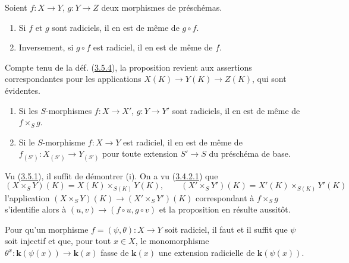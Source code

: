 \begin{proposition}[3.5.6]
\label{I.3.5.6-fr}
Soient $f:X\to Y$, $g:Y\to Z$ deux morphismes de préschémas.
\begin{enumerate}
  \item[(i)] Si $f$ et $g$ sont radiciels, il en est de même de $g\circ f$.
  \item[(ii)] Inversement, si $g\circ f$ est radiciel, il en est de même de
  $f$.
\end{enumerate}
\end{proposition}

Compte tenu de la déf. (\hyperref[I.3.5.4-fr]{3.5.4}), la proposition revient
aux assertions correspondantes pour les applications
$X(K)\to Y(K)\to Z(K)$, qui sont évidentes.

\begin{proposition}[3.5.7]
\label{I.3.5.7-fr}
\begin{enumerate}
  \item[(i)] Si les $S$-morphismes $f:X\to X'$, $g:Y\to Y'$ sont radiciels,
  il en est de même de $f\times_S g$.
  \item[(ii)] Si le $S$-morphisme $f:X\to Y$ est radiciel, il en est de même
  de $f_{(S')}:X_{(S')}\to Y_{(S')}$ pour toute extension $S'\to S$ du
  préschéma de base.
\end{enumerate}
\end{proposition}

Vu (\hyperref[I.3.5.1-fr]{3.5.1}), il suffit de démontrer (i). On a vu
(\hyperref[I.3.4.2.1-fr]{3.4.2.1}) que
\label{I.3.5.7.field-valued-product-fr}
\[
  (X\times_S Y)(K)=X(K)\times_{S(K)}Y(K),\qquad
  (X'\times_S Y')(K)=X'(K)\times_{S(K)}Y'(K)
\]
l'application $(X\times_S Y)(K)\to(X'\times_S Y')(K)$ correspondant à
$f\times_S g$ s'identifie alors à $(u,v)\to(f\circ u,g\circ v)$ et la
proposition en résulte aussitôt.

\begin{proposition}[3.5.8]
\label{I.3.5.8-fr}
Pour qu'un morphisme $f=(\psi,\theta):X\to Y$ soit radiciel, il faut et il
suffit que $\psi$ soit injectif et que, pour tout $x\in X$, le monomorphisme
$\theta^x:\boldsymbol{k}(\psi(x))\to\boldsymbol{k}(x)$ fasse de $\boldsymbol{k}(x)$ une extension radicielle de
$\boldsymbol{k}(\psi(x))$.
\end{proposition}

